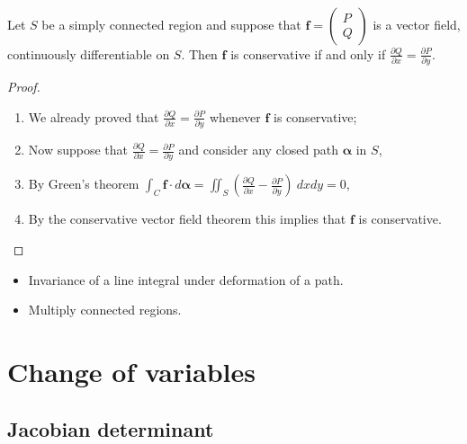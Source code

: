 \documentclass[aspectratio=169,handout]{beamer}
\newcommand{\ff}{\mathbf{f}}
\newcommand{\aalpha}{\boldsymbol{\alpha}}
\begin{document}
\begin{frame}
    \frametitle{}


    \begin{theorem}
        Let \(S\) be a simply connected region and suppose that \(\ff = \left(\begin{smallmatrix}
            P \\ Q
        \end{smallmatrix}\right)\)
        is a vector field, continuously differentiable on \(S\).
        Then \(\ff\) is conservative if and only if \(\tfrac{\partial Q}{\partial x} = \tfrac{\partial P}{\partial y}\).
    \end{theorem}

    \begin{proof}
    \begin{enumerate}
        \item We already proved that \(\tfrac{\partial Q}{\partial x} = \tfrac{\partial P}{\partial y}\) whenever \(\ff\) is conservative;
        \item Now suppose that  \(\tfrac{\partial Q}{\partial x} = \tfrac{\partial P}{\partial y}\) and consider any closed path \(\aalpha\) in \(S\),
        \item By Green's theorem \(\int_{C} \ff \cdot d\aalpha = \iint_{S} \left(\tfrac{\partial Q}{\partial x} - \tfrac{\partial P}{\partial y}\right) \ dxdy = 0\),
        \item By the conservative vector field theorem this implies that \(\ff\) is conservative.
    \end{enumerate}    
    \end{proof}

    \begin{itemize}
        \item     Invariance of a line integral under deformation of a path.
        \item Multiply connected regions.
    \end{itemize}
\end{frame}



\section{Change of variables}

\subsection{Jacobian determinant}
\end{document}
